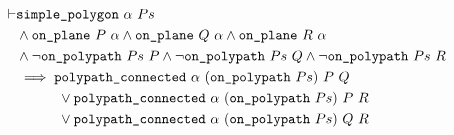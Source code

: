 \begin{align*}
\vdash &\code{simple\_polygon}\ \alpha\ Ps\\
       &\wedge \code{on\_plane}\ P\ \alpha \wedge \code{on\_plane}\ Q\ \alpha \wedge \code{on\_plane}\ R\ \alpha\\
       &\wedge \neg\code{on\_polypath}\ Ps\ P\wedge \neg\code{on\_polypath}\ Ps\ Q\wedge \neg\code{on\_polypath}\ Ps\ R\\
       &\implies \code{polypath\_connected}\ \alpha\ (\code{on\_polypath}\ Ps)\ P\ Q\\
       &\qquad\quad\vee \code{polypath\_connected}\ \alpha\ (\code{on\_polypath}\ Ps)\ P\ R\\
       &\qquad\quad\vee \code{polypath\_connected}\ \alpha\ (\code{on\_polypath}\ Ps)\ Q\ R
\end{align*}

